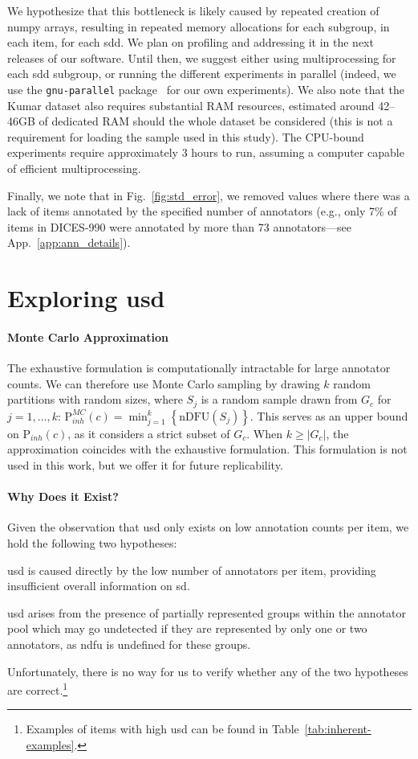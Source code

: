 \documentclass[manuscript,screen,review,anonymous]{acmart}
\theoremstyle{acmplain}
\theoremstyle{researchquestionstyle}
\begin{document}
We hypothesize that this bottleneck is likely caused by repeated creation of numpy arrays, resulting in repeated memory allocations for each subgroup, in each item, for each \ac{sdd}. We plan on profiling and addressing it in the next releases of our software. Until then, we suggest either using multiprocessing for each \ac{sdd} subgroup, or running the different experiments in parallel (indeed, we use the \texttt{gnu-parallel} package~\citep{tange_2025_16944306} for our own experiments). We also note that the Kumar dataset also requires substantial RAM resources, estimated around 42--46GB of dedicated RAM should the whole dataset be considered (this is not a requirement for loading the sample used in this study). The CPU-bound experiments require approximately 3 hours to run, assuming a computer capable of efficient multiprocessing.

Finally, we note that in Fig.~\ref{fig:std_error}, we removed values where there was a lack of items annotated by the specified number of annotators (e.g., only 7\% of items in DICES-990 were annotated by more than 73 annotators---see App.~\ref{app:ann_details}).


\section{Exploring \ac{usd}}
\label{app:usd}

\paragraph{Monte Carlo Approximation} The exhaustive formulation is computationally intractable for large annotator counts. We can therefore use Monte Carlo sampling by drawing $k$ random partitions with random sizes, where $S_j$ is a random sample drawn from $G_c$ for $j=1, \dots, k$: $\mathrm{P}_{inh}^{MC}(c) = \min_{j=1}^{k} \left\{ \mathrm{nDFU}(S_j) \right\}$. This serves as an upper bound on $\mathrm{P}_{inh}(c)$, as it considers a strict subset of $G_c$. When $k \geq \lvert G_c \rvert$, the approximation coincides with the exhaustive formulation. This formulation is not used in this work, but we offer it for future replicability.

\paragraph{Why Does it Exist?} Given the observation that \ac{usd} only exists on low annotation counts per item, we hold the following two hypotheses:
\begin{enumerate*}
	\item \ac{usd} is caused directly by the low number of annotators per item, providing insufficient overall information on \ac{sd}.
	\item \ac{usd} arises from the presence of partially represented groups within the annotator pool which may go undetected if they are represented by only one or two annotators, as \ac{ndfu} is undefined for these groups. 
\end{enumerate*}
Unfortunately, there is no way for us to verify whether any of the two hypotheses are correct.\footnote{Examples of items with high \ac{usd} can be found in Table~\ref{tab:inherent-examples}.}
\end{document}
